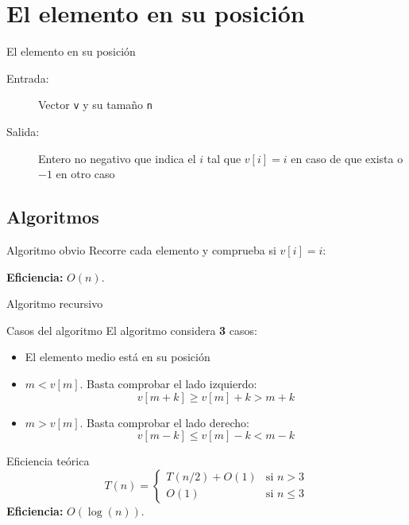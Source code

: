 \section{El elemento en su posición}

\begin{frame}{El elemento en su posición}
\begin{description}
 \item[Entrada:] Vector \texttt{v} y su tamaño \texttt{n}
 \item[Salida:] Entero no negativo que indica el $i$ tal que $v[i]=i$ en caso de que exista o $-1$ en otro caso
\end{description}
\end{frame}

\subsection{Algoritmos}

\begin{frame}[fragile]{Algoritmo obvio}
Recorre cada elemento y comprueba si $v[i] = i$:

\textbf{Eficiencia:} $O(n)$.
\end{frame}

\begin{frame}[fragile]{Algoritmo recursivo}

\end{frame}

\begin{frame}{Casos del algoritmo}
El algoritmo considera \textbf{3} casos:
\begin{itemize}
  \item El elemento medio está en su posición
  \item $m < v[m]$. Basta comprobar el lado izquierdo:
  \[v[m + k] \geq v[m]+k>m+k\]
  \item $m > v[m]$. Basta comprobar el lado derecho:
  \[v[m - k] \leq v[m] -k < m - k\]
\end{itemize}
\end{frame}

\begin{frame}{Eficiencia teórica}
\[T(n) = \begin{cases} T(n/2) + O(1) & \mbox{si } n > 3 \\
O(1) & \mbox{si } n \leq 3 \end{cases}\]
\textbf{Eficiencia:} $O(\log(n))$.
\end{frame}

